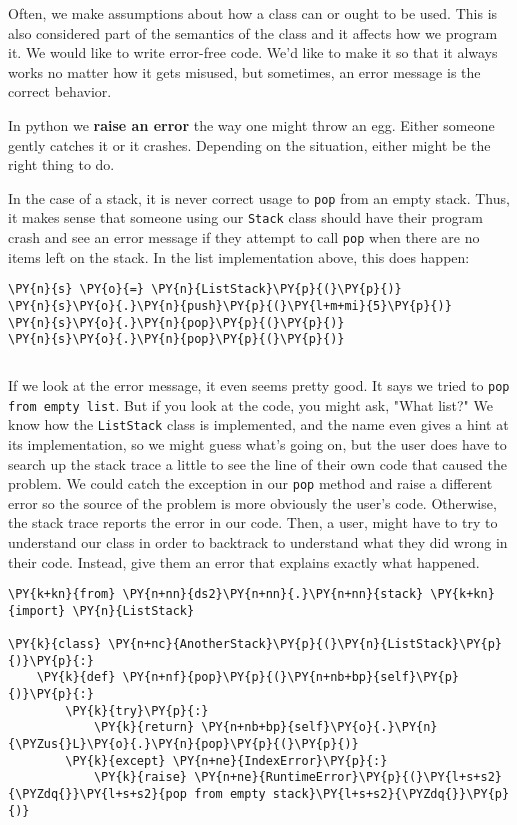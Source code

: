 Often, we make assumptions about how a class can or ought to be used.
This is also considered part of the semantics of the class and it affects how we program it.
We would like to write error-free code.
We'd like to make it so that it always works no matter how it gets misused, but sometimes, an error message is the correct behavior.


In python we \textbf{raise an error} the way one might throw an egg.
Either someone gently catches it or it crashes.
Depending on the situation, either might be the right thing to do.


In the case of a stack, it is never correct usage to \texttt{pop} from an empty stack.
Thus, it makes sense that someone using our \texttt{Stack} class should have their program crash and see an error message if they attempt to call \texttt{pop} when there are no items left on the stack.
In the list implementation above, this does happen:


\begin{Verbatim}[commandchars=\\\{\}]
\PY{n}{s} \PY{o}{=} \PY{n}{ListStack}\PY{p}{(}\PY{p}{)}
\PY{n}{s}\PY{o}{.}\PY{n}{push}\PY{p}{(}\PY{l+m+mi}{5}\PY{p}{)}
\PY{n}{s}\PY{o}{.}\PY{n}{pop}\PY{p}{(}\PY{p}{)}
\PY{n}{s}\PY{o}{.}\PY{n}{pop}\PY{p}{(}\PY{p}{)}
\end{Verbatim}

\begin{Verbatim}
\end{Verbatim}


If we look at the error message, it even seems pretty good.
It says we tried to \texttt{pop from empty list}.
But if you look at the code, you might ask, "What list?"
We know how the \texttt{ListStack} class is implemented, and the name even gives a hint at its implementation, so we might guess what's going on, but the user does have to search up the stack trace a little to see the line of their own code that caused the problem.
We could catch the exception in our \texttt{pop} method and raise a different error so the source of the problem is more obviously the user's code.
Otherwise, the stack trace reports the error in our code.
Then, a user, might have to try to understand our class in order to backtrack to understand what they did wrong in their code.
Instead, give them an error that explains exactly what happened.

\begin{Verbatim}[commandchars=\\\{\}]
\PY{k+kn}{from} \PY{n+nn}{ds2}\PY{n+nn}{.}\PY{n+nn}{stack} \PY{k+kn}{import} \PY{n}{ListStack}

\PY{k}{class} \PY{n+nc}{AnotherStack}\PY{p}{(}\PY{n}{ListStack}\PY{p}{)}\PY{p}{:}
    \PY{k}{def} \PY{n+nf}{pop}\PY{p}{(}\PY{n+nb+bp}{self}\PY{p}{)}\PY{p}{:}
        \PY{k}{try}\PY{p}{:}
            \PY{k}{return} \PY{n+nb+bp}{self}\PY{o}{.}\PY{n}{\PYZus{}L}\PY{o}{.}\PY{n}{pop}\PY{p}{(}\PY{p}{)}
        \PY{k}{except} \PY{n+ne}{IndexError}\PY{p}{:}
            \PY{k}{raise} \PY{n+ne}{RuntimeError}\PY{p}{(}\PY{l+s+s2}{\PYZdq{}}\PY{l+s+s2}{pop from empty stack}\PY{l+s+s2}{\PYZdq{}}\PY{p}{)}
\end{Verbatim}



